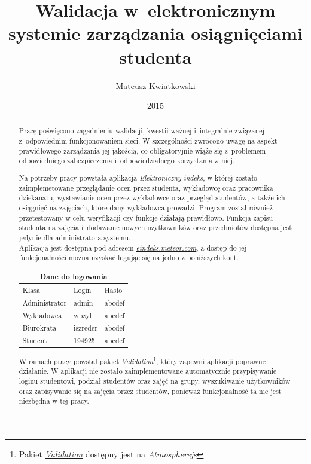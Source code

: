 \documentclass[openright]{xmgr}
\author   {Mateusz Kwiatkowski}
\title    {Walidacja w~elektronicznym systemie zarządzania osiągnięciami studenta}
\date     {2015}
\begin{document}
\begin{abstract}

\indent \indent \indent Pracę poświęcono zagadnieniu walidacji, kwestii ważnej i~integralnie związanej z~odpowiednim funkcjonowaniem sieci.
W szczególności zwrócono uwagę na aspekt prawidłowego zarządzania jej jakością, co obligatoryjnie wiąże się z~problemem
odpowiedniego zabezpieczenia i~odpowiedzialnego korzystania z~niej.

Na potrzeby pracy powstała aplikacja \textit{Elektroniczny indeks}, w której zostało zaimplemetowane przeglądanie ocen przez studenta, wykładowcę oraz pracownika dziekanatu, wystawianie ocen przez wykładowce oraz przegląd studentów, a także ich osiągnięć na zajęciach, które dany wykładowca prowadzi. Program został również przetestowany w celu weryfikacji czy funkcje działają prawidłowo. Funkcja zapisu studenta na zajęcia i~dodawanie nowych użytkowników oraz przedmiotów dostępna jest jedynie dla administratora systemu.
\\
\indent Aplikacja jest dostępna pod adresem \href{http://eindeks.meteor.com}{\textit{eindeks.meteor.com}}, a dostęp do jej funkcjonalności można uzyskać logując się na jedno z poniższych kont.

\begin{tabular}{ |p{3cm}|p{3cm}|p{3cm}|  }
 \hline
 \multicolumn{3}{|c|}{Dane do logowania} \\
 \hline
 Klasa & Login & Hasło\\
 \hline
 Administrator & admin & abcdef\\
 Wykładowca & wbzyl & abcdef\\
 Biurokrata & iszreder & abcdef\\
 Student& 194925 & abcdef\\
 \hline
\end{tabular}
\newline
W ramach pracy powstał pakiet \textit{Validation}\footnote{Pakiet \href{https://atmospherejs.com/emflover/validation}{\textit{Validation}} dostępny jest na \textit{Atmospherejs}}, który zapewni aplikacji poprawne działanie. W aplikacji nie zostało zaimplementowane automatycznie przypisywanie loginu studentowi, podział studentów oraz zajęć na grupy, wyszukiwanie użytkowników oraz zapisywanie się na zajęcia przez studentów, ponieważ funkcjonalność ta nie jest niezbędna w tej pracy.




\end{abstract}
\end{document}
